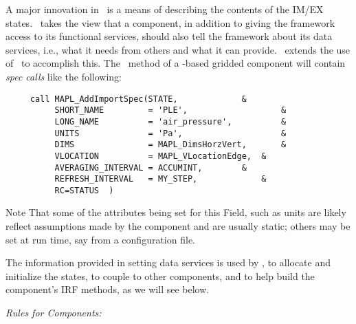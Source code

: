 A major innovation in \ggn\   is a means of describing the
contents of the IM/EX states. \ggn\   takes the view that a
component, in addition to giving the framework access to its
functional services, should also tell the framework about its data
services, i.e., what it needs from others and what it can provide.
\ggn\   extends the use of \ssv\   to accomplish this. The
\ssv\   method of a \ggn-based gridded component will
contain {\em spec calls} like the following:

\begin{verbatim}
     call MAPL_AddImportSpec(STATE,       		&
          SHORT_NAME         = 'PLE',                   &
          LONG_NAME          = 'air_pressure',          &
          UNITS              = 'Pa',                    &
          DIMS               = MAPL_DimsHorzVert,      	&
          VLOCATION          = MAPL_VLocationEdge, 	&
          AVERAGING_INTERVAL = ACCUMINT,   		&
          REFRESH_INTERVAL   = MY_STEP,       		&
          RC=STATUS  )
\end{verbatim}

Note That some of the attributes being set for this Field, such as
units are likely reflect assumptions made by the
component and are usually static; others may be set at run time, say from
a configuration file.

The information provided in setting data
services is used by \ggn, to allocate and initialize the
states, to couple to other components, and to help build the
component's IRF methods, as we will see below.


{\em Rules for Components:}

